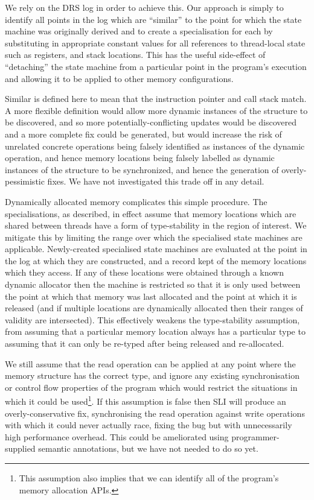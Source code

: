 \documentclass[10pt,letter,twocolumn]{sigplanconf}
\newcommand{\editorial}[1]{}
\begin{document}
We rely on the DRS log in order to achieve this.  Our approach is
simply to identify all points in the log which are ``similar'' to the
point for which the state machine was originally derived and to create
a specialisation for each by substituting in appropriate constant
values for all references to thread-local state such as registers, and
stack locations.  This has the useful side-effect of ``detaching'' the
state machine from a particular point in the program's execution and
allowing it to be applied to other memory configurations.

Similar is defined here to mean that the instruction pointer and call
stack match.  A more flexible definition would allow more dynamic
instances of the structure to be discovered, and so more
potentially-conflicting updates would be discovered and a more
complete fix could be generated, but would increase the risk of
unrelated concrete operations being falsely identified as instances of
the dynamic operation, and hence memory locations being falsely
labelled as dynamic instances of the structure to be synchronized, and
hence the generation of overly-pessimistic fixes\editorial{Holly run
  on sentence, Batman.}.  We have not investigated this trade off in
any detail.

Dynamically allocated memory complicates this simple procedure.  The
specialisations, as described, in effect assume that memory locations
which are shared between threads have a form of type-stability in the
region of interest.  We mitigate this by limiting the range over which
the specialised state machines are applicable.  Newly-created
specialised state machines are evaluated at the point in the log at
which they are constructed, and a record kept of the memory locations
which they access.  If any of these locations were obtained through a
known dynamic allocator then the machine is restricted so that it is
only used between the point at which that memory was last allocated
and the point at which it is released (and if multiple locations are
dynamically allocated then their ranges of validity are intersected).
This effectively weakens the type-stability assumption, from assuming
that a particular memory location always has a particular type to
assuming that it can only be re-typed after being released and
re-allocated.\editorial{This isn't right: after specialisation, we
  could still refer to pointers in the heap, and we won't track
  validity of the referenced objects.  Probably doesn't matter in
  practice.}

We still assume that the read operation can be applied at any point
where the memory structure has the correct type, and ignore any
existing synchronisation or control flow properties of the program
which would restrict the situations in which it could be
used\footnote{This assumption also implies that we can identify all of
  the program's memory allocation APIs.}.  If this assumption is false
then SLI will produce an overly-conservative fix, synchronising the
read operation against write operations with which it could never
actually race, fixing the bug but with unnecessarily high performance
overhead.  This could be ameliorated using programmer-supplied
semantic annotations, but we have not needed to do so yet.
\end{document}
